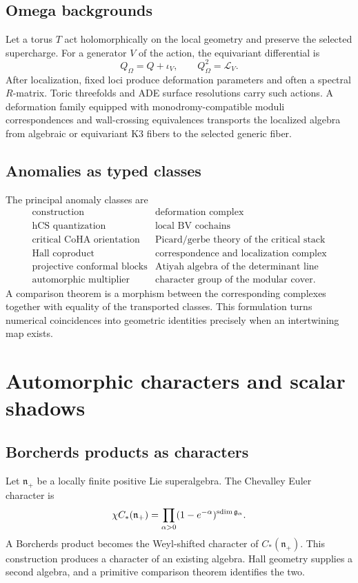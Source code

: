 \chapter{Omega backgrounds}
Let a torus $T$ act holomorphically on the local geometry and preserve the selected supercharge. For a generator $V$ of the action, the equivariant differential is
\[
 Q_\Omega=Q+\iota_V,
 \qquad Q_\Omega^2=\mathcal L_V.
\]
After localization, fixed loci produce deformation parameters and often a spectral $R$-matrix. Toric threefolds and ADE surface resolutions carry such actions. A deformation family equipped with monodromy-compatible moduli correspondences and wall-crossing equivalences transports the localized algebra from algebraic or equivariant K3 fibers to the selected generic fiber.

\chapter{Anomalies as typed classes}
The principal anomaly classes are
\[
\begin{array}{c|c}
\text{construction}&\text{deformation complex}\\ \hline
\text{hCS quantization}&\text{local BV cochains}\\
\text{critical CoHA orientation}&\text{Picard/gerbe theory of the critical stack}\\
\text{Hall coproduct}&\text{correspondence and localization complex}\\
\text{projective conformal blocks}&\text{Atiyah algebra of the determinant line}\\
\text{automorphic multiplier}&\text{character group of the modular cover}.
\end{array}
\]
A comparison theorem is a morphism between the corresponding complexes together with equality of the transported classes. This formulation turns numerical coincidences into geometric identities precisely when an intertwining map exists.

\part[Automorphic forms]{Automorphic characters and scalar shadows}

\chapter{Borcherds products as characters}
Let $\mathfrak n_+$ be a locally finite positive Lie superalgebra. The Chevalley Euler character is
\[
 \chi C_*(\mathfrak n_+)
 =\prod_{\alpha>0}(1-e^{-\alpha})^{\operatorname{sdim}\mathfrak g_\alpha}.
\]
A Borcherds product becomes the Weyl-shifted character of $C_*(\mathfrak n_+)$. This construction produces a character of an existing algebra. Hall geometry supplies a second algebra, and a primitive comparison theorem identifies the two.

